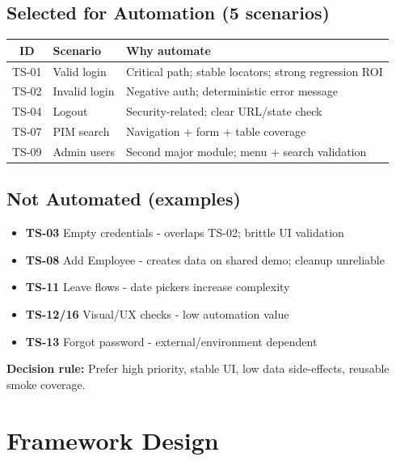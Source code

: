 ﻿\documentclass[11pt,a4paper]{article}
\begin{document}
\subsection{Selected for Automation (5 scenarios)}
\begin{table}[H]
\centering
\begin{tabular}{@{}clp{6.5cm}@{}}
\toprule
\textbf{ID} & \textbf{Scenario} & \textbf{Why automate} \\
\midrule
TS-01 & Valid login & Critical path; stable locators; strong regression ROI \\
TS-02 & Invalid login & Negative auth; deterministic error message \\
TS-04 & Logout & Security-related; clear URL/state check \\
TS-07 & PIM search & Navigation + form + table coverage \\
TS-09 & Admin users & Second major module; menu + search validation \\
\bottomrule
\end{tabular}
\end{table}

\subsection{Not Automated (examples)}
\begin{itemize}[noitemsep]
  \item \textbf{TS-03} Empty credentials - overlaps TS-02; brittle UI validation
  \item \textbf{TS-08} Add Employee - creates data on shared demo; cleanup unreliable
  \item \textbf{TS-11} Leave flows - date pickers increase complexity
  \item \textbf{TS-12/16} Visual/UX checks - low automation value
  \item \textbf{TS-13} Forgot password - external/environment dependent
\end{itemize}

\noindent\textbf{Decision rule:} Prefer high priority, stable UI, low data side-effects, reusable smoke coverage.

\section{Framework Design}
\end{document}
